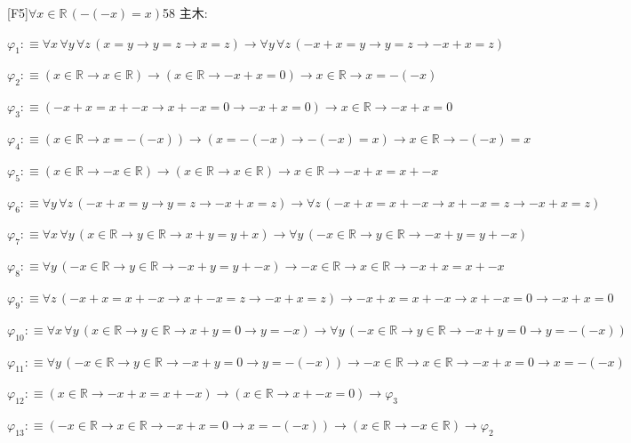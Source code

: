 \begin{fullproof}{[F5]}{$\forall x \in \mathbb{R}\,(-(-x) = x)$}{58}
\noindent 主木:
\begin{ptree}
\noLine
{}
\noLine
{}
\end{ptree}
\begin{abbrevlist}
\item $\varphi_{1} :\equiv \forall x\,\forall y\,\forall z\,(x = y \to y = z \to x = z) \to \forall y\,\forall z\,(-x + x = y \to y = z \to -x + x = z)$
\item $\varphi_{2} :\equiv (x \in \mathbb{R} \to x \in \mathbb{R}) \to (x \in \mathbb{R} \to -x + x = 0) \to x \in \mathbb{R} \to x = -(-x)$
\item $\varphi_{3} :\equiv (-x + x = x + -x \to x + -x = 0 \to -x + x = 0) \to x \in \mathbb{R} \to -x + x = 0$
\item $\varphi_{4} :\equiv (x \in \mathbb{R} \to x = -(-x)) \to (x = -(-x) \to -(-x) = x) \to x \in \mathbb{R} \to -(-x) = x$
\item $\varphi_{5} :\equiv (x \in \mathbb{R} \to -x \in \mathbb{R}) \to (x \in \mathbb{R} \to x \in \mathbb{R}) \to x \in \mathbb{R} \to -x + x = x + -x$
\item $\varphi_{6} :\equiv \forall y\,\forall z\,(-x + x = y \to y = z \to -x + x = z) \to \forall z\,(-x + x = x + -x \to x + -x = z \to -x + x = z)$
\item $\varphi_{7} :\equiv \forall x\,\forall y\,(x \in \mathbb{R} \to y \in \mathbb{R} \to x + y = y + x) \to \forall y\,(-x \in \mathbb{R} \to y \in \mathbb{R} \to -x + y = y + -x)$
\item $\varphi_{8} :\equiv \forall y\,(-x \in \mathbb{R} \to y \in \mathbb{R} \to -x + y = y + -x) \to -x \in \mathbb{R} \to x \in \mathbb{R} \to -x + x = x + -x$
\item $\varphi_{9} :\equiv \forall z\,(-x + x = x + -x \to x + -x = z \to -x + x = z) \to -x + x = x + -x \to x + -x = 0 \to -x + x = 0$
\item $\varphi_{10} :\equiv \forall x\,\forall y\,(x \in \mathbb{R} \to y \in \mathbb{R} \to x + y = 0 \to y = -x) \to \forall y\,(-x \in \mathbb{R} \to y \in \mathbb{R} \to -x + y = 0 \to y = -(-x))$
\item $\varphi_{11} :\equiv \forall y\,(-x \in \mathbb{R} \to y \in \mathbb{R} \to -x + y = 0 \to y = -(-x)) \to -x \in \mathbb{R} \to x \in \mathbb{R} \to -x + x = 0 \to x = -(-x)$
\item $\varphi_{12} :\equiv (x \in \mathbb{R} \to -x + x = x + -x) \to (x \in \mathbb{R} \to x + -x = 0) \to \varphi_{3}$
\item $\varphi_{13} :\equiv (-x \in \mathbb{R} \to x \in \mathbb{R} \to -x + x = 0 \to x = -(-x)) \to (x \in \mathbb{R} \to -x \in \mathbb{R}) \to \varphi_{2}$
\end{abbrevlist}
\end{fullproof}
